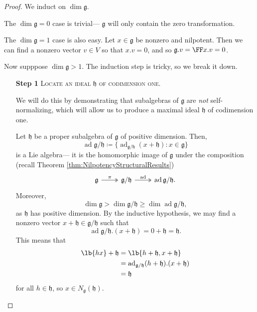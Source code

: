 \documentclass{article}
\DeclarePairedDelimiter\lb\lbrack\rbrack
\newcommand*\ad{\operatorname{ad}}
\newcommand*\frkg{{\ensuremath{\mathfrak{g}}}}
\newcommand*\frkh{{\ensuremath{\mathfrak{h}}}}
\newcommand*\acts{.}
\begin{document}
\begin{proof}
    We induct on $\dim \frkg$.

    The $\dim \frkg = 0$ case is trivial--- $\frkg$ will only contain the zero transformation.

    The $\dim \frkg = 1$ case is also easy.
    Let $x \in \frkg$ be nonzero and nilpotent.
    Then  we can find a nonzero vector $v \in V$ so that $x \acts v = 0$, and so $\frkg \acts v = \FF x \acts v = 0$.

    Now supppose $\dim \frkg > 1$.
    The induction step is tricky, so we break it down.
    \begin{itemize}
        \item[\textbf{Step 1}] 
            \textsc{\color{Crimson} Locate an ideal $\frkh$ of codimension one.}

            We will do this by demonstrating that subalgebras of $\frkg$ are \textit{not} self-normalizing, which will allow us to produce a maximal ideal $\frkh$ of codimension one.

            Let $\frkh$ be a proper subalgebra of $\frkg$ of positive dimension.
            Then,
            \[
                \ad \frkg/\frkh
                \coloneq
                \Big\{
                    \ad_{\frkg/\frkh}(x + \frkh)
                    :
                    x \in \frkg
                \Big\}
            \]
            is a Lie algebra--- it is the homomorphic image of $\frkg$ under the composition (recall Theorem \ref{thm:NilpotencyStructuralResults})
            \[
                \begin{tikzcd}
                    \frkg \arrow[r, "\pi", two heads] & \frkg/\frkh \arrow[r, "\ad", two heads] & \ad \frkg/\frkh. 
                \end{tikzcd}
            \]
            Moreover, 
            \[
                \dim \frkg > \dim \frkg/\frkh \geq \dim \ad \frkg/\frkh,
            \]
            as $\frkh$ has positive dimension.
            By the inductive hypothesis, we may find a nonzero vector $x + \frkh \in \frkg/\frkh$ such that
            \[
                \ad \frkg/\frkh \acts (x + \frkh) 
                = 
                0 + \frkh = \frkh.
            \]
            This means that
            \begin{align*}
                \lb{hx} + \frkh
                &=
                \lb{h + \frkh, x + \frkh}
                \\
                &=
                \ad_{\frkg/\frkh} (h + \frkh) \acts (x + \frkh) 
                \\
                &= 
                \frkh
            \end{align*}
            for all $h \in \frkh$, so $x \in N_\frkg(\frkh)$.


\end{itemize}
\end{proof}
\end{document}
